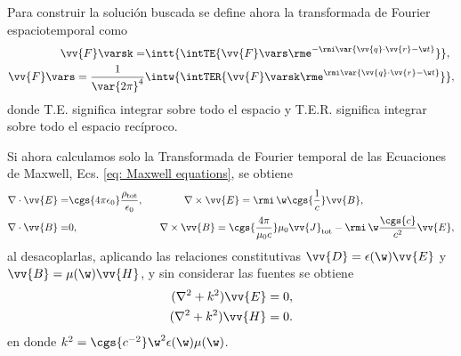 \label{AppendixScalarPotentials}
Para construir la solución buscada se define ahora la transformada de Fourier espaciotemporal como
\begin{align}
\vv{F}\varsk = &\intt{\intTE{ \vv{F}\vars \rme^{-\rmi \var{\vv{q}\cdot\vv{r}-\w t}} }},\nonumber \\
\vv{F}\vars = \frac{1}{\var{2\pi}^4}&\intw{\intTER{ \vv{F}\varsk \rme^{\rmi\var{\vv{q}\cdot\vv{r}-\w t}} }},
\end{align}
donde T.E. significa integrar sobre todo el espacio y T.E.R. significa integrar sobre todo el espacio recíproco. 

Si ahora calculamos solo la Transformada de Fourier temporal de las Ecuaciones de Maxwell, Ecs. \eqref{eq: Maxwell equations}, se obtiene
\begin{align}
\nabla\cdot\vv{E} =& \cgs{4\pi\epsilon_0}\frac{\rho_{\text{tot}}}{\epsilon_0}, \qquad \qquad \nabla\times\vv{E}= \rmi \,\w\cgs{\frac{1}{c}}\vv{B}, \nonumber \\
\nabla\cdot\vv{B} =& 0, \qquad \qquad \qquad \qquad \nabla\times\vv{B}=\cgs{\frac{4\pi}{\mu_0 c}}\mu_0\vv{J}_{\text{tot}}- \rmi \, \w\frac{\cgs{c}}{c^2}\vv{E},
\label{eq: Maxwell equations freq}
\end{align}
al desacoplarlas, aplicando las relaciones constitutivas $\vv{D}=\epsilon(\w)\vv{E}$ y $\vv{B} = \mu(\w) \vv{H}$, y sin considerar las fuentes se obtiene
\begin{align*}
(\nabla^2 + k^2)\vv{E} = 0, \\
(\nabla^2 + k^2)\vv{H} = 0.
\end{align*}
en donde $k^2= \cgs{c^{-2}} \w^2 \epsilon(\w) \mu(\w)$.

